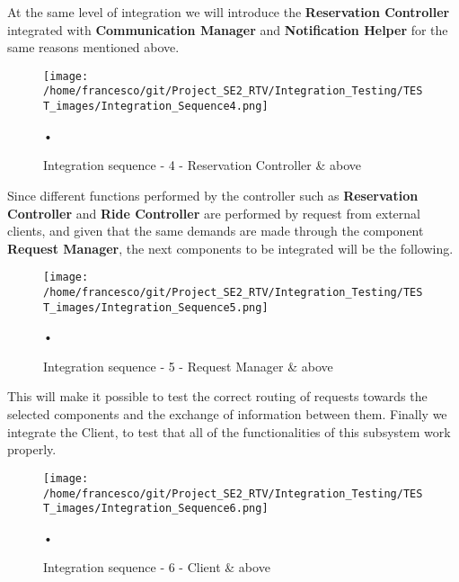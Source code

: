 \documentclass[10pt, a4paper,titlepage]{article}
\begin{document}
At the same level of integration we will introduce the \textbf{Reservation Controller} integrated with \textbf{Communication Manager} and \textbf{Notification Helper} for the same reasons mentioned above.
\begin{figure}[h]
\begin{center}
\texttt{[image: /home/francesco/git/Project\_SE2\_RTV/Integration\_Testing/TEST\_images/Integration\_Sequence4.png]}
\caption{Integration sequence - 4 - Reservation Controller \& above}
\label{fig:int_seq4}
\end{center}•
\end{figure}
\clearpage
Since different functions performed by the controller such as \textbf{Reservation Controller} and \textbf{Ride Controller} are performed by request from external clients, and given that the same demands are made through the component \textbf{Request Manager}, the next components to be integrated will be the following.
\begin{figure}[h]
\begin{center}
\texttt{[image: /home/francesco/git/Project\_SE2\_RTV/Integration\_Testing/TEST\_images/Integration\_Sequence5.png]}
\caption{Integration sequence - 5 - Request Manager \& above}
\label{fig:int_seq5}
\end{center}•
\end{figure}
\clearpage
This will make it possible to test the correct routing of requests towards the selected components and the exchange of information between them.
Finally we integrate the Client, to test that all of the functionalities of this subsystem work properly.
\begin{figure}[h]
\begin{center}
\texttt{[image: /home/francesco/git/Project\_SE2\_RTV/Integration\_Testing/TEST\_images/Integration\_Sequence6.png]}
\caption{Integration sequence - 6 - Client \& above}
\label{fig:int_seq6}
\end{center}•
\end{figure}
\clearpage
\end{document}
